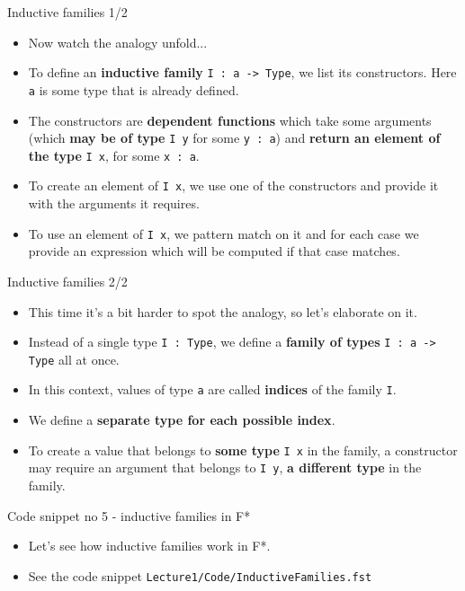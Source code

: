 \documentclass{beamer}
\newcommand{\m}[1]{\texttt{#1}}
\begin{document}
\begin{frame}{Inductive families 1/2}
\begin{itemize}
	\item Now watch the analogy unfold...
	\item To define an \textbf{inductive family} \m{I : a -> Type}, we list its constructors. Here \m{a} is some type that is already defined.
	\item The constructors are \textbf{dependent functions} which take some arguments (which \textbf{may be of type} \m{I y} for some \m{y :\ a}) and \textbf{return an element of the type} \m{I x}, for some \m{x :\ a}.
	\item To create an element of \m{I x}, we use one of the constructors and provide it with the arguments it requires.
	\item To use an element of \m{I x}, we pattern match on it and for each case we provide an expression which will be computed if that case matches.
\end{itemize}
\end{frame}

\begin{frame}{Inductive families 2/2}
\begin{itemize}
	\item This time it's a bit harder to spot the analogy, so let's elaborate on it.
	\item Instead of a single type \m{I :\ Type}, we define a \textbf{family of types} \m{I :\ a -> Type} all at once.
	\item In this context, values of type \m{a} are called \textbf{indices} of the family \m{I}.
	\item We define a \textbf{separate type for each possible index}.
	\item To create a value that belongs to \textbf{some type} \m{I x} in the family, a constructor may require an argument that belongs to \m{I y}, \textbf{a different type} in the family.
\end{itemize}
\end{frame}

\begin{frame}{Code snippet no 5 - inductive families in F*}
\begin{itemize}
	\item Let's see how inductive families work in F*.
	\item See the code snippet \m{Lecture1/Code/InductiveFamilies.fst}
\end{itemize}
\end{frame}
\end{document}
